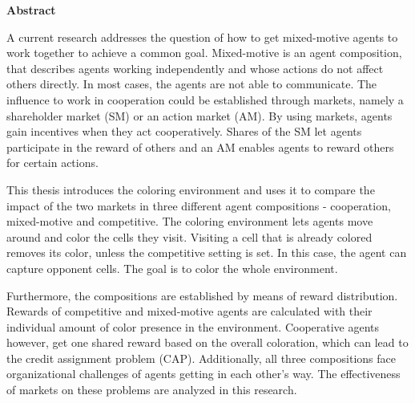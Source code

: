 \vspace*{2cm}

\begin{center}
    \textbf{Abstract}
\end{center}

\vspace*{1cm}

\noindent A current research addresses the question of how to get mixed-motive agents to work together to achieve a common goal. Mixed-motive is an agent composition, that describes agents working independently and whose actions do not affect others directly. In most cases, the agents are not able to communicate. The influence to work in cooperation could be established through markets, namely a shareholder market (SM) or an action market (AM). By using markets, agents gain incentives when they act cooperatively. Shares of the SM let agents participate in the reward of others and an AM enables agents to reward others for certain actions.

This thesis introduces the coloring environment and uses it to compare the impact of the two markets in three different agent compositions - cooperation, mixed-motive and competitive. The coloring environment lets agents move around and color the cells they visit. Visiting a cell that is already colored removes its color, unless the competitive setting is set. In this case, the agent can capture opponent cells. The goal is to color the whole environment.

Furthermore, the compositions are established by means of reward distribution. Rewards of competitive and mixed-motive agents are calculated with their individual amount of color presence in the environment. Cooperative agents however, get one shared reward based on the overall coloration, which can lead to the credit assignment problem (CAP). Additionally, all three compositions face organizational challenges of agents getting in each other's way. The effectiveness of markets on these problems are analyzed in this research. 